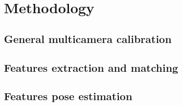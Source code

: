 \chapter{Methodology}

\label{chapter:methodology}



\section{General multicamera calibration}

\section{Features extraction and matching}

\section{Features pose estimation}

